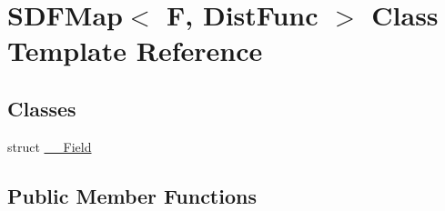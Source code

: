 \hypertarget{classSDFMap}{}\section{S\+D\+F\+Map$<$ F, Dist\+Func $>$ Class Template Reference}
\label{classSDFMap}
\subsection*{Classes}
\begin{DoxyCompactItemize}
\item 
struct \hyperlink{structSDFMap_1_1____Field}{\+\_\+\+\_\+\+Field}
\end{DoxyCompactItemize}
\subsection*{Public Member Functions}
